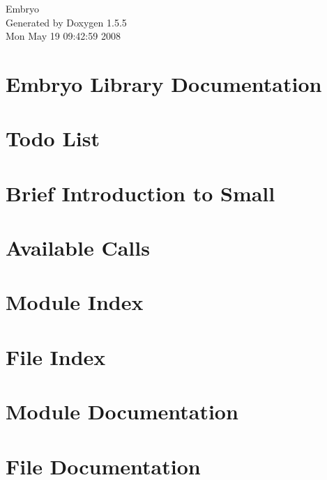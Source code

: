 \documentclass[a4paper]{book}
\begin{document}
\begin{titlepage}
\vspace*{7cm}
\begin{center}
{\Large Embryo }\\
\vspace*{1cm}
{\large Generated by Doxygen 1.5.5}\\
\vspace*{0.5cm}
{\small Mon May 19 09:42:59 2008}\\
\end{center}
\end{titlepage}
\clearemptydoublepage
{}
\tableofcontents
\clearemptydoublepage
{}
\chapter{Embryo Library Documentation }
\label{index}\hypertarget{index}{}
\chapter{Todo List}

\chapter{Brief Introduction to Small}

\chapter{Available Calls}

\chapter{Module Index}

\chapter{File Index}

\chapter{Module Documentation}












\chapter{File Documentation}

\printindex
\end{document}
